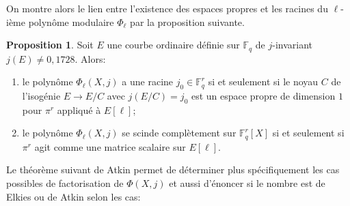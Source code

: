\documentclass[10pt,a4paper]{book}
\theoremstyle{plain}
\theoremstyle{definition}
\theoremstyle{definition}
\theoremstyle{definition}
\theoremstyle{definition}
\newtheorem{prop}[thm]{Proposition}
\theoremstyle{definition}
\theoremstyle{remark}
\theoremstyle{remark}
\theoremstyle{definition}
\begin{document}
On montre alors le lien entre l'existence des espaces propres et les racines du $\ell$-ième polynôme modulaire $\Phi_{\ell}$ par la proposition suivante. 

 
 
 


\begin{prop}\label{pro:def-ss-grp}
Soit $E$ une courbe ordinaire définie sur $\mathbb{F}_q$ de $j$-invariant $j(E) \neq 0, 1728$. Alors:
\begin{enumerate}
\item le polynôme $\Phi_{\ell}(X,j)$ a une racine $j_0 \in \mathbb{F}_{q}^r$ si et seulement si le noyau $C$ de l'isogénie $E \to E/C$ avec $j(E/C)=j_0$ est un espace propre de dimension $1$ pour $\pi^r$ appliqué à $E[\ell]$;
\item le polynôme $\Phi_{\ell}(X,j)$ se scinde complètement sur $ \mathbb{F}_{q}^r[X]$ si et seulement si $\pi^r$ agit comme une matrice scalaire sur $E[\ell]$.
\end{enumerate}
\end{prop}

Le théorème suivant de Atkin permet de déterminer plus spécifiquement les cas possibles de factorisation de $\Phi(X,j)$  et aussi d'énoncer si le nombre est de Elkies ou de Atkin selon les cas:
\end{document}
